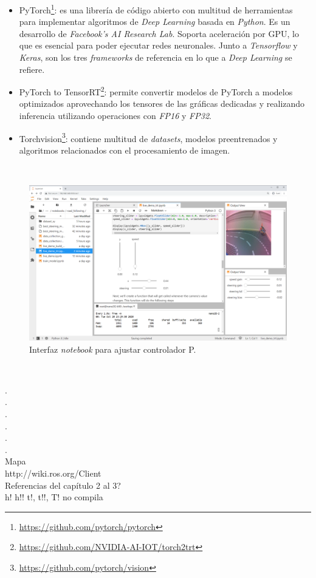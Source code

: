 \begin{itemize}
	\item PyTorch\footnote{\url{https://github.com/pytorch/pytorch}}: es una librería de código abierto con multitud de herramientas para implementar algoritmos de \textit{Deep Learning} basada en \textit{Python}\cite{autopilottesla}. Es un desarrollo de \textit{Facebook's AI Research Lab}. Soporta aceleración por GPU, lo que es esencial para poder ejecutar redes neuronales. Junto a \textit{Tensorflow} y \textit{Keras}, son los tres \textit{frameworks} de referencia en lo que a \textit{Deep Learning} se refiere.
	\item PyTorch to TensorRT\footnote{\url{https://github.com/NVIDIA-AI-IOT/torch2trt}}: permite convertir modelos de PyTorch a modelos optimizados aprovechando los tensores de las gráficas dedicadas y realizando inferencia utilizando operaciones con \textit{FP16} y \textit{FP32}.
	\item Torchvision\footnote{\url{https://github.com/pytorch/vision}}: contiene multitud de \textit{datasets}, modelos preentrenados y algoritmos relacionados con el procesamiento de imagen.
\end{itemize}\

\begin{figure} [h!]
	\begin{center}
		\includegraphics[width=14cm]{figs/livejetracer}
	\end{center}
	\caption{Interfaz \textit{notebook} para ajustar controlador P.}
	\label{fig:livejetracer}
\end{figure}\

.\\
.\\
.\\
.\\
.\\
.\\
Mapa\\
http://wiki.ros.org/Client%
\\Referencias del capítulo 2 al 3?\\
h! h!! t!, t!!, T! no compila\\